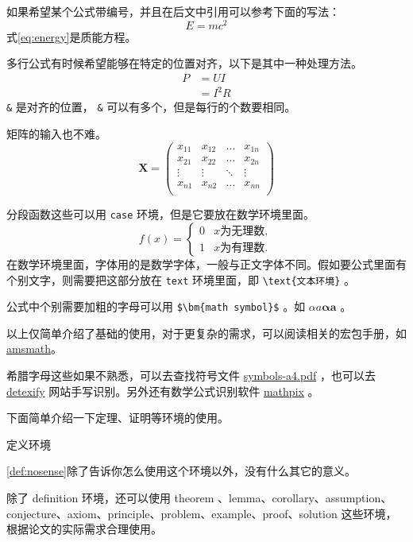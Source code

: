 如果希望某个公式带编号，并且在后文中引用可以参考下面的写法：
\begin{equation}
E=mc^2
\label{eq:energy}
\end{equation}
式\cref{eq:energy}是质能方程。

多行公式有时候希望能够在特定的位置对齐，以下是其中一种处理方法。
\begin{align}
P & = UI \\
& = I^2R
\end{align}
\verb|&| 是对齐的位置， \verb|&| 可以有多个，但是每行的个数要相同。

矩阵的输入也不难。
\[
\mathbf{X} = \left(
    \begin{array}{cccc}
    x_{11} & x_{12} & \ldots & x_{1n}\\
    x_{21} & x_{22} & \ldots & x_{2n}\\
    \vdots & \vdots & \ddots & \vdots\\
    x_{n1} & x_{n2} & \ldots & x_{nn}\\
    \end{array} \right)
\]

分段函数这些可以用 \verb|case| 环境，但是它要放在数学环境里面。
\[
f(x) =
    \begin{cases}
        0 &  x \text{为无理数} ,\\
        1 &  x \text{为有理数} .
    \end{cases}
\]
在数学环境里面，字体用的是数学字体，一般与正文字体不同。假如要公式里面有个别文字，则需要把这部分放在 \verb|text| 环境里面，即 \verb|\text{文本环境}| 。

公式中个别需要加粗的字母可以用 \verb|$\bm{math symbol}$| 。如 $ \alpha a\bm{\alpha a} $ 。

以上仅简单介绍了基础的使用，对于更复杂的需求，可以阅读相关的宏包手册，如 \href{http://texdoc.net/texmf-dist/doc/latex/amsmath/amsldoc.pdf}{amsmath}。

希腊字母这些如果不熟悉，可以去查找符号文件 \href{http://mirrors.ctan.org/info/symbols/comprehensive/symbols-a4.pdf}{symbols-a4.pdf} ，也可以去 \href{http://detexify.kirelabs.org/classify.html}{detexify} 网站手写识别。另外还有数学公式识别软件 \href{https://mathpix.com/}{mathpix} 。

下面简单介绍一下定理、证明等环境的使用。
\begin{definition}
    定义环境
    \label{def:nosense}
\end{definition}
\cref{def:nosense}除了告诉你怎么使用这个环境以外，没有什么其它的意义。

除了 definition 环境，还可以使用 theorem 、lemma、corollary、assumption、conjecture、axiom、principle、problem、example、proof、solution 这些环境，根据论文的实际需求合理使用。

